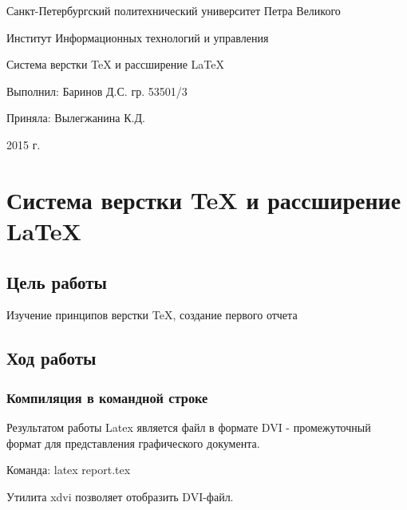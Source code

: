 \documentclass[a4paper, 12pt]{article}
\begin{document}
\begin{titlepage} \begin{center}

	\Large			
Санкт-Петербургский политехнический университет Петра Великого
			
	\vspace{0.2cm}	
Институт Информационных технологий и управления

	\vspace{2cm} \vfill \huge
Система верстки \TeX{} и рассширение \LaTeX{}

\vfill 

\begin{flushleft} \large \hangindent=8cm 
Выполнил: Баринов Д.С. гр. 53501/3 \hrulefill

Приняла: Вылегжанина К.Д. \hrulefill
\end{flushleft}

		
\vspace{2cm} \vfill \large
2015 г.
		

\end{center} \end{titlepage}

\newpage

\section{Система верстки \TeX{} и рассширение \LaTeX{}}

\subsection{Цель работы}

Изучение принципов верстки \TeX{}, создание первого отчета 

\subsection{Ход работы}

\subsubsection{Компиляция в командной строке}


Результатом работы Latex является файл в формате DVI - промежуточный формат для представления графического документа.

Команда: latex report.tex

Утилита xdvi позволяет отобразить DVI-файл.
\end{document}
